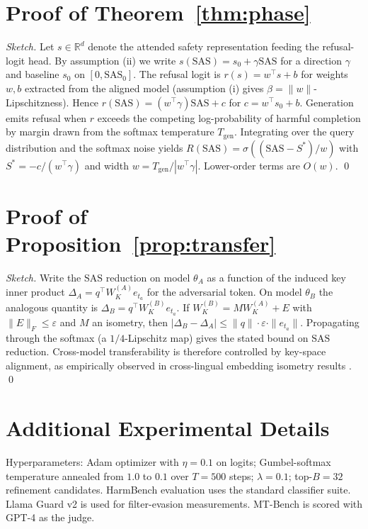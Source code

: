 \documentclass{article}
\theoremstyle{definition}
\theoremstyle{remark}
\newcommand{\SAS}{\mathrm{SAS}}
\newcommand{\R}{\mathbb{R}}
\begin{document}



\appendix

\section{Proof of Theorem~\ref{thm:phase}}
\label{app:phase}

\emph{Sketch.} Let $s \in \R^d$ denote the attended safety representation feeding the refusal-logit head. By assumption (ii) we write $s(\SAS) = s_0 + \gamma \SAS$ for a direction $\gamma$ and baseline $s_0$ on $[0,\SAS_0]$. The refusal logit is $r(s) = w^\top s + b$ for weights $w,b$ extracted from the aligned model (assumption (i) gives $\beta = \|w\|$-Lipschitzness). Hence $r(\SAS) = (w^\top \gamma) \SAS + c$ for $c = w^\top s_0 + b$. Generation emits refusal when $r$ exceeds the competing log-probability of harmful completion by margin drawn from the softmax temperature $T_{\mathrm{gen}}$. Integrating over the query distribution and the softmax noise yields $R(\SAS) = \sigma((\SAS - S^*)/w)$ with $S^* = -c/(w^\top \gamma)$ and width $w = T_{\mathrm{gen}}/|w^\top \gamma|$. Lower-order terms are $O(w)$. \qed

\section{Proof of Proposition~\ref{prop:transfer}}
\label{app:transfer}

\emph{Sketch.} Write the $\SAS$ reduction on model $\theta_A$ as a function of the induced key inner product $\Delta_A = q^\top W_K^{(A)} e_{t_a}$ for the adversarial token. On model $\theta_B$ the analogous quantity is $\Delta_B = q^\top W_K^{(B)} e_{t_a}$. If $W_K^{(B)} = M W_K^{(A)} + E$ with $\|E\|_F \leq \varepsilon$ and $M$ an isometry, then $|\Delta_B - \Delta_A| \leq \|q\| \cdot \varepsilon \cdot \|e_{t_a}\|$. Propagating through the softmax (a $1/4$-Lipschitz map) gives the stated bound on $\SAS$ reduction. Cross-model transferability is therefore controlled by key-space alignment, as empirically observed in cross-lingual embedding isometry results \cite{artetxe2018robust}. \qed

\section{Additional Experimental Details}
\label{app:exp}

Hyperparameters: Adam optimizer with $\eta = 0.1$ on logits; Gumbel-softmax temperature annealed from $1.0$ to $0.1$ over $T{=}500$ steps; $\lambda = 0.1$; top-$B = 32$ refinement candidates. HarmBench evaluation uses the standard classifier suite. Llama Guard v2 is used for filter-evasion measurements. MT-Bench is scored with GPT-4 as the judge.
\end{document}
